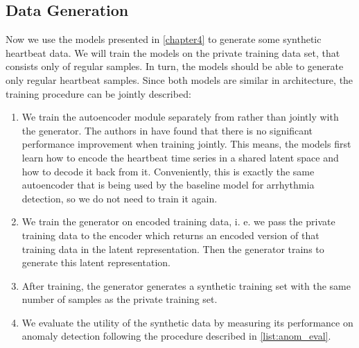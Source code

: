 \subsection{Data Generation}
Now we use the models presented in \cref{chapter4} to generate some synthetic heartbeat data. We will train the models on the private training data set, that consists only of regular samples. In turn, the models should be able to generate only regular heartbeat samples. Since both models are similar in architecture, the training procedure can be jointly described:
\begin{enumerate}
    \item We train the autoencoder module separately from rather than jointly with the generator. The authors in \parencite{pei2021towards} have found that there is no significant performance improvement when training jointly. This means, the models first learn how to encode the heartbeat time series in a shared latent space and how to decode it back from it. Conveniently, this is exactly the same autoencoder that is being used by the baseline model for arrhythmia detection, so we do not need to train it again.
    \item We train the generator on encoded training data, i. e. we pass the private training data to the encoder which returns an encoded version of that training data in the latent representation. Then the generator trains to generate this latent representation.
    \item After training, the generator generates a synthetic training set with the same number of samples as the private training set.
    \item We evaluate the utility of the synthetic data by measuring its performance on anomaly detection following the procedure described in \cref{list:anom_eval}.
\end{enumerate}

